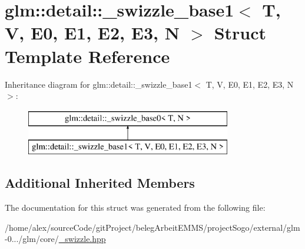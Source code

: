 \hypertarget{structglm_1_1detail_1_1__swizzle__base1}{\section{glm\-:\-:detail\-:\-:\-\_\-swizzle\-\_\-base1$<$ T, V, E0, E1, E2, E3, N $>$ Struct Template Reference}
\label{structglm_1_1detail_1_1__swizzle__base1}
}
Inheritance diagram for glm\-:\-:detail\-:\-:\-\_\-swizzle\-\_\-base1$<$ T, V, E0, E1, E2, E3, N $>$\-:\begin{figure}[H]
\begin{center}
\leavevmode
\includegraphics[height=2.000000cm]{structglm_1_1detail_1_1__swizzle__base1}
\end{center}
\end{figure}
\subsection*{Additional Inherited Members}


The documentation for this struct was generated from the following file\-:\begin{DoxyCompactItemize}
\item 
/home/alex/source\-Code/git\-Project/beleg\-Arbeit\-E\-M\-M\-S/project\-Sogo/external/glm-\/0.../glm/core/\hyperlink{__swizzle_8hpp}{\-\_\-swizzle.\-hpp}\end{DoxyCompactItemize}
